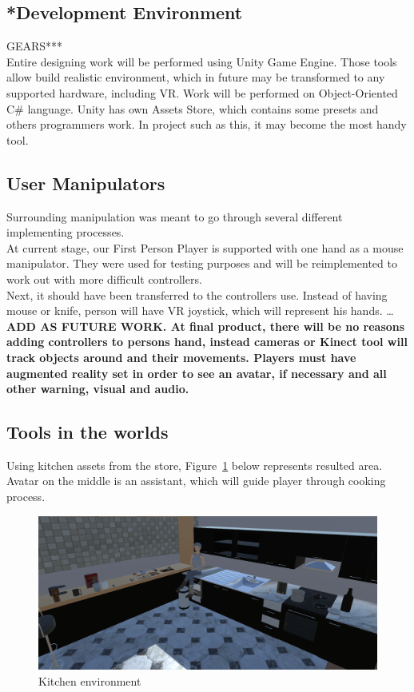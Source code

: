 \documentclass[18pt]{article}
\numberwithin{equation}{section} %
\numberwithin{figure}{section} %
\numberwithin{table}{section} %
\begin{document}
	\subsection{*Development Environment}
	GEARS***\\
	Entire designing work will be performed using Unity Game Engine. Those tools allow build realistic environment, which in future may be transformed to any supported hardware, including VR. Work will be performed on Object-Oriented C\# language. Unity has own Assets Store, which contains some presets and others programmers work. In project such as this, it may become the most handy tool.
	\subsection{User Manipulators}
	Surrounding manipulation was meant to go through several different implementing processes.\\	
	At current stage, our First Person Player is supported with one hand as a mouse manipulator. They were used for testing purposes and will be reimplemented to work out with more difficult controllers. \\
	
	Next, it should have been transferred to the controllers use. Instead of having mouse or knife, person will have VR joystick, which will represent his hands. \ldots \\
	
	\textbf{ ADD AS FUTURE WORK. At final product, there will be no reasons adding controllers to persons hand, instead cameras or Kinect tool will track objects around and their movements.  Players must have augmented reality set in order to see an avatar, if necessary and all other warning, visual and audio.\\}
	
	
	\subsection{Tools in the worlds}
	Using kitchen assets from the store, Figure~\ref{fig:kitchen} below represents resulted area. Avatar on the middle is an assistant, which will guide player through cooking process. 
	\begin{figure}[H]
		\centering
		\includegraphics[width=0.7\linewidth]{images/kitchen}
		\caption{Kitchen environment}
		\label{fig:kitchen}
	\end{figure}
	
\end{document}

